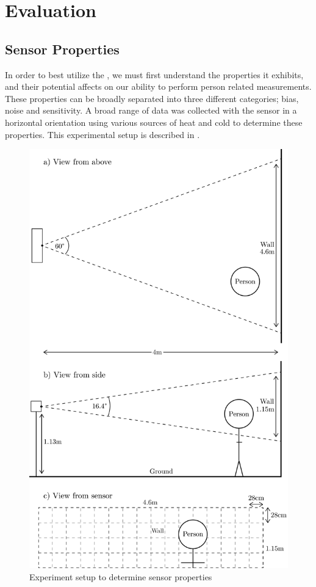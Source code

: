 \documentclass[../thesis/thesis.tex]{subfiles}
\begin{document}
 \chapter{Evaluation}

\section{Sensor Properties}

In order to best utilize the \mlx, we must first understand the properties it exhibits, and their potential affects on our ability to perform person related measurements. These properties can be broadly separated into three different categories; bias, noise and sensitivity. A broad range of data was collected with the sensor in a horizontal orientation using various sources of heat and cold to determine these properties. This experimental setup is described in .

\begin{figure}
\centering
\includegraphics[height=0.9\textheight]{../diagrams/second-exp-setup2.pdf}
\caption{Experiment setup to determine sensor properties}
\label{fig:exps:2setup}
\end{figure}
\end{document}

